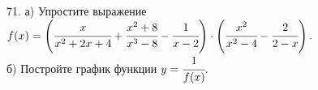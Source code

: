 71. а) Упростите выражение $f(x)=\left(\cfrac{x}{x^2+2x+4}+\cfrac{x^2+8}{x^3-8}-\cfrac{1}{x-2}\right)\cdot\left(
\cfrac{x^2}{x^2-4}-\cfrac{2}{2-x}\right).$\\
б) Постройте график функции $y=\cfrac{1}{f(x)}.$\\
